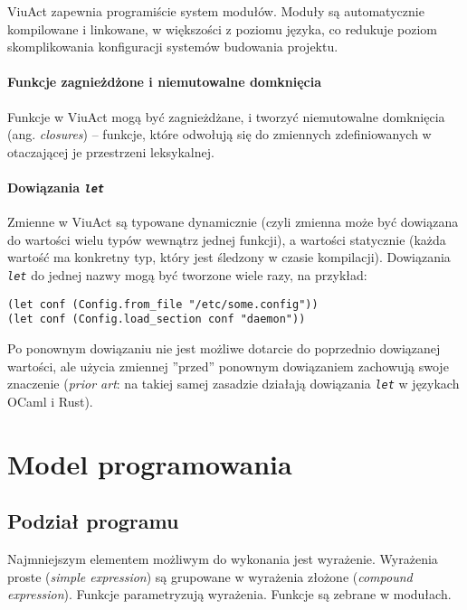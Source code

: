 ViuAct zapewnia programiście system modułów. Moduły są automatycznie kompilowane i linkowane, w większości z
poziomu języka, co redukuje poziom skomplikowania konfiguracji systemów budowania projektu.

\paragraph*{Funkcje zagnieżdżone i niemutowalne domknięcia}

Funkcje w ViuAct mogą być zagnieżdżane, i tworzyć niemutowalne domknięcia (ang. \emph{closures}) -- funkcje,
które odwołują się do zmiennych zdefiniowanych w otaczającej je przestrzeni leksykalnej.

\paragraph*{Dowiązania \emph{\texttt{let}}}

Zmienne w ViuAct są typowane dynamicznie (czyli zmienna może być dowiązana do wartości wielu typów wewnątrz
jednej funkcji), a wartości statycznie (każda wartość ma konkretny typ, który jest śledzony w czasie
kompilacji). Dowiązania \emph{\texttt{let}} do jednej nazwy mogą być tworzone wiele razy, na przykład:

\begin{lstlisting}
(let conf (Config.from_file "/etc/some.config"))
(let conf (Config.load_section conf "daemon"))
\end{lstlisting}

Po ponownym dowiązaniu nie jest możliwe dotarcie do poprzednio dowiązanej wartości, ale użycia zmiennej
''przed'' ponownym dowiązaniem zachowują swoje znaczenie (\emph{prior art}: na takiej samej zasadzie działają
dowiązania \emph{\texttt{let}} w językach OCaml i Rust).

\section{Model programowania}

\subsection{Podział programu}

Najmniejszym elementem możliwym do wykonania jest wyrażenie.
Wyrażenia proste (\emph{simple expression}) są grupowane w wyrażenia złożone (\emph{compound expression}).
Funkcje parametryzują wyrażenia.
Funkcje są zebrane w modułach.

